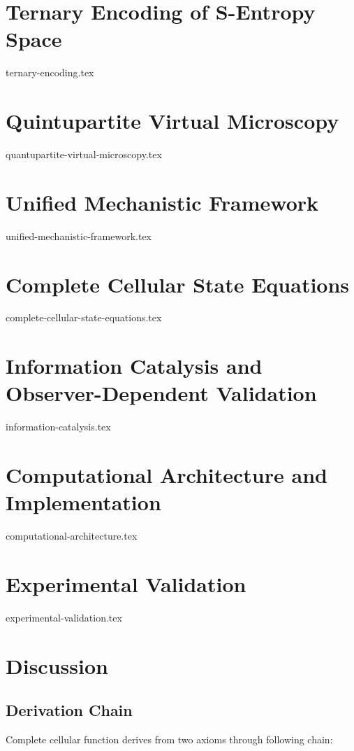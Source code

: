 \documentclass[11pt,a4paper]{article}
\theoremstyle{remark}
\begin{document}
\section{Ternary Encoding of S-Entropy Space}
{ternary-encoding.tex}

\section{Quintupartite Virtual Microscopy}
{quantupartite-virtual-microscopy.tex}

\section{Unified Mechanistic Framework}
{unified-mechanistic-framework.tex}

\section{Complete Cellular State Equations}
{complete-cellular-state-equations.tex}

\section{Information Catalysis and Observer-Dependent Validation}
{information-catalysis.tex}

\section{Computational Architecture and Implementation}
{computational-architecture.tex}

\section{Experimental Validation}
{experimental-validation.tex}

\section{Discussion}

\subsection{Derivation Chain}

Complete cellular function derives from two axioms through following chain:
\end{document}
